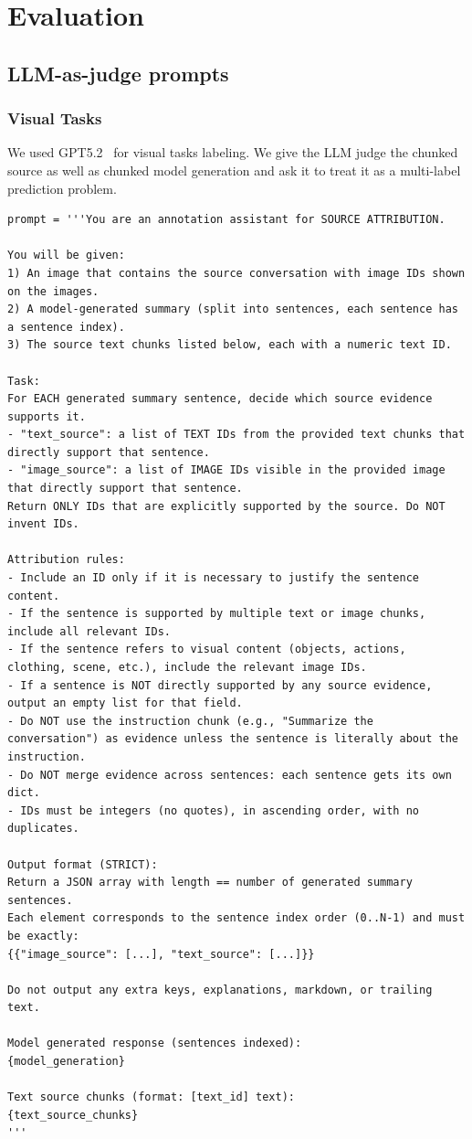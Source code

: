 \section{Evaluation}

\subsection{LLM-as-judge prompts}
\label{appendix:llm_judge_prompt}
\subsubsection{Visual Tasks}
We used GPT5.2~\cite{gpt-5.2} for visual tasks labeling. We give the LLM judge the chunked source as well as chunked model generation and ask it to treat it as a multi-label prediction problem.

\begin{lstlisting}
prompt = '''You are an annotation assistant for SOURCE ATTRIBUTION.

You will be given:
1) An image that contains the source conversation with image IDs shown on the images.
2) A model-generated summary (split into sentences, each sentence has a sentence index).
3) The source text chunks listed below, each with a numeric text ID.

Task:
For EACH generated summary sentence, decide which source evidence supports it.
- "text_source": a list of TEXT IDs from the provided text chunks that directly support that sentence.
- "image_source": a list of IMAGE IDs visible in the provided image that directly support that sentence.
Return ONLY IDs that are explicitly supported by the source. Do NOT invent IDs.

Attribution rules:
- Include an ID only if it is necessary to justify the sentence content.
- If the sentence is supported by multiple text or image chunks, include all relevant IDs.
- If the sentence refers to visual content (objects, actions, clothing, scene, etc.), include the relevant image IDs.
- If a sentence is NOT directly supported by any source evidence, output an empty list for that field.
- Do NOT use the instruction chunk (e.g., "Summarize the conversation") as evidence unless the sentence is literally about the instruction.
- Do NOT merge evidence across sentences: each sentence gets its own dict.
- IDs must be integers (no quotes), in ascending order, with no duplicates.

Output format (STRICT):
Return a JSON array with length == number of generated summary sentences.
Each element corresponds to the sentence index order (0..N-1) and must be exactly:
{{"image_source": [...], "text_source": [...]}}

Do not output any extra keys, explanations, markdown, or trailing text.

Model generated response (sentences indexed):
{model_generation}

Text source chunks (format: [text_id] text):
{text_source_chunks}
'''
\end{lstlisting}

